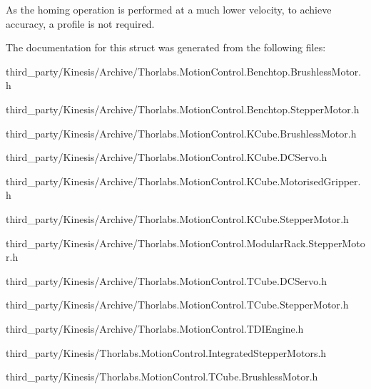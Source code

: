 As the homing operation is performed at a much lower velocity, to achieve accuracy, a profile is not required.

The documentation for this struct was generated from the following files\+:\begin{DoxyCompactItemize}
\item 
third\+\_\+party/\+Kinesis/\+Archive/Thorlabs.\+Motion\+Control.\+Benchtop.\+Brushless\+Motor.\+h\item 
third\+\_\+party/\+Kinesis/\+Archive/Thorlabs.\+Motion\+Control.\+Benchtop.\+Stepper\+Motor.\+h\item 
third\+\_\+party/\+Kinesis/\+Archive/Thorlabs.\+Motion\+Control.\+K\+Cube.\+Brushless\+Motor.\+h\item 
third\+\_\+party/\+Kinesis/\+Archive/Thorlabs.\+Motion\+Control.\+K\+Cube.\+D\+C\+Servo.\+h\item 
third\+\_\+party/\+Kinesis/\+Archive/Thorlabs.\+Motion\+Control.\+K\+Cube.\+Motorised\+Gripper.\+h\item 
third\+\_\+party/\+Kinesis/\+Archive/Thorlabs.\+Motion\+Control.\+K\+Cube.\+Stepper\+Motor.\+h\item 
third\+\_\+party/\+Kinesis/\+Archive/Thorlabs.\+Motion\+Control.\+Modular\+Rack.\+Stepper\+Motor.\+h\item 
third\+\_\+party/\+Kinesis/\+Archive/Thorlabs.\+Motion\+Control.\+T\+Cube.\+D\+C\+Servo.\+h\item 
third\+\_\+party/\+Kinesis/\+Archive/Thorlabs.\+Motion\+Control.\+T\+Cube.\+Stepper\+Motor.\+h\item 
third\+\_\+party/\+Kinesis/\+Archive/Thorlabs.\+Motion\+Control.\+T\+D\+I\+Engine.\+h\item 
third\+\_\+party/\+Kinesis/Thorlabs.\+Motion\+Control.\+Integrated\+Stepper\+Motors.\+h\item 
third\+\_\+party/\+Kinesis/Thorlabs.\+Motion\+Control.\+T\+Cube.\+Brushless\+Motor.\+h\end{DoxyCompactItemize}
